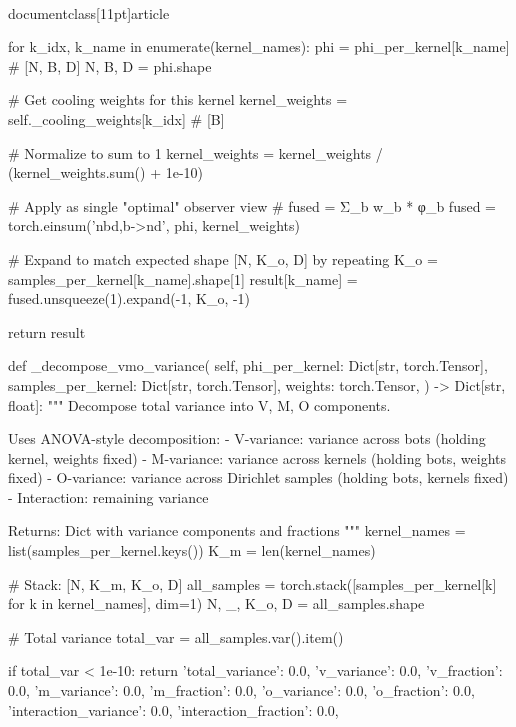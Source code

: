 \\documentclass[11pt]{article}
\begin{document}
\begin{CodeBlock}
{{{{        for k_idx, k_name in enumerate(kernel_names):
            phi = phi_per_kernel[k_name]  # [N, B, D]
            N, B, D = phi.shape
            
            # Get cooling weights for this kernel
            kernel_weights = self._cooling_weights[k_idx]  # [B]
            
            # Normalize to sum to 1
            kernel_weights = kernel_weights / (kernel_weights.sum() + 1e-10)
            
            # Apply as single "optimal" observer view
            # fused = Σ_b w_b * φ_b
            fused = torch.einsum('nbd,b->nd', phi, kernel_weights)
            
            # Expand to match expected shape [N, K_o, D] by repeating
            K_o = samples_per_kernel[k_name].shape[1]
            result[k_name] = fused.unsqueeze(1).expand(-1, K_o, -1)
        
        return result
    
    def _decompose_vmo_variance(
        self,
        phi_per_kernel: Dict[str, torch.Tensor],
        samples_per_kernel: Dict[str, torch.Tensor],
        weights: torch.Tensor,
    ) -> Dict[str, float]:
        """
        Decompose total variance into V, M, O components.
        
        Uses ANOVA-style decomposition:
        - V-variance: variance across bots (holding kernel, weights fixed)
        - M-variance: variance across kernels (holding bots, weights fixed)
        - O-variance: variance across Dirichlet samples (holding bots, kernels fixed)
        - Interaction: remaining variance
        
        Returns:
            Dict with variance components and fractions
        """
        kernel_names = list(samples_per_kernel.keys())
        K_m = len(kernel_names)
        
        # Stack: [N, K_m, K_o, D]
        all_samples = torch.stack([samples_per_kernel[k] for k in kernel_names], dim=1)
        N, _, K_o, D = all_samples.shape
        
        # Total variance
        total_var = all_samples.var().item()
        
        if total_var < 1e-10:
            return {
                'total_variance': 0.0,
                'v_variance': 0.0, 'v_fraction': 0.0,
                'm_variance': 0.0, 'm_fraction': 0.0,
                'o_variance': 0.0, 'o_fraction': 0.0,
                'interaction_variance': 0.0, 'interaction_fraction': 0.0,
            }
        
}}}}
\end{CodeBlock}
\end{document}
